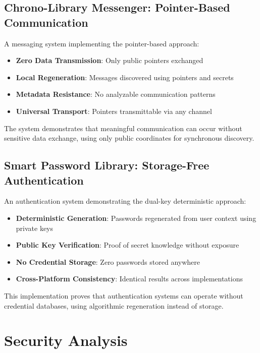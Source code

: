 \documentclass[11pt,a4paper]{article}
\begin{document}
\subsection{Chrono-Library Messenger: Pointer-Based Communication}

A messaging system implementing the pointer-based approach:

\begin{itemize}
    \item \textbf{Zero Data Transmission}: Only public pointers exchanged
    \item \textbf{Local Regeneration}: Messages discovered using pointers and secrets
    \item \textbf{Metadata Resistance}: No analyzable communication patterns
    \item \textbf{Universal Transport}: Pointers transmittable via any channel
\end{itemize}

The system demonstrates that meaningful communication can occur without sensitive data exchange, using only public coordinates for synchronous discovery.

\subsection{Smart Password Library: Storage-Free Authentication}

An authentication system demonstrating the dual-key deterministic approach:

\begin{itemize}
    \item \textbf{Deterministic Generation}: Passwords regenerated from user context using private keys
    \item \textbf{Public Key Verification}: Proof of secret knowledge without exposure
    \item \textbf{No Credential Storage}: Zero passwords stored anywhere
    \item \textbf{Cross-Platform Consistency}: Identical results across implementations
\end{itemize}

This implementation proves that authentication systems can operate without credential databases, using algorithmic regeneration instead of storage.

\section{Security Analysis}
\end{document}
